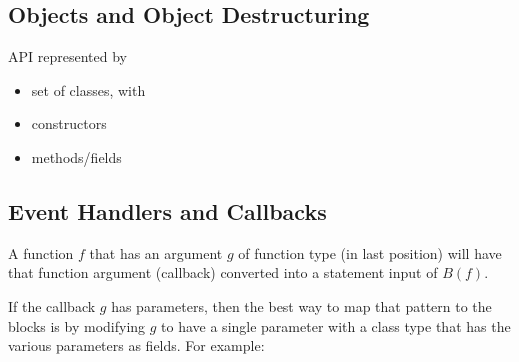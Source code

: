 \subsection{Objects and Object Destructuring}
API represented by
\begin{itemize}
  \item set of classes, with
  \item constructors
  \item methods/fields
\end{itemize}

\subsection{Event Handlers and Callbacks}


A function $f$ that has an argument $g$ of function type (in last position) will have
that function argument (callback) converted into a statement input of $B(f)$.

If the callback $g$ has parameters, then
the best way to map that pattern to the blocks is by modifying
$g$ to have a single parameter with a class type that has the
various parameters as fields.
For example:








